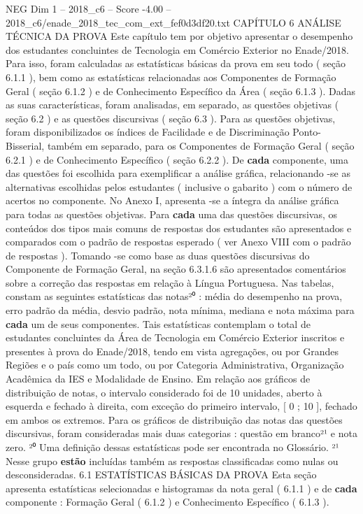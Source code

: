 \begin{textsample}{NEG Dim 1 – 2018\_c6 – Score -4.00 – 2018\_c6/enade\_2018\_tec\_com\_ext\_fef0d3df20.txt}  \label{ex:f1_neg_194}
CAPÍTULO 6 ANÁLISE TÉCNICA DA PROVA Este capítulo tem por objetivo apresentar o desempenho dos estudantes concluintes de Tecnologia em Comércio Exterior no Enade/2018.
Para isso, foram calculadas as estatísticas básicas da prova em seu todo ( seção 6.1.1 ), bem como as estatísticas relacionadas aos Componentes de Formação Geral ( seção 6.1.2 ) e de Conhecimento Específico da Área ( seção 6.1.3 ).
Dadas as suas características, foram analisadas, em separado, as questões objetivas ( seção 6.2 ) e as questões discursivas ( seção 6.3 ).
Para as questões objetivas, foram disponibilizados os índices de Facilidade e de Discriminação Ponto-Bisserial, também em separado, para os Componentes de Formação Geral ( seção 6.2.1 ) e de Conhecimento Específico ( seção 6.2.2 ).
De \textbf{cada} componente, uma das questões foi escolhida para exemplificar a análise gráfica, relacionando -se as alternativas escolhidas pelos estudantes ( inclusive o gabarito ) com o número de acertos no componente.
No Anexo I, apresenta -se a íntegra da análise gráfica para todas as questões objetivas.
Para \textbf{cada} uma das questões discursivas, os conteúdos dos tipos mais comuns de respostas dos estudantes são apresentados e comparados com o padrão de respostas esperado ( ver Anexo VIII com o padrão de respostas ).
Tomando -se como base as duas questões discursivas do Componente de Formação Geral, na seção 6.3.1.6 são apresentados comentários sobre a correção das respostas em relação à Língua Portuguesa.
Nas tabelas, constam as seguintes estatísticas das notas²⁰ : média do desempenho na prova, erro padrão da média, desvio padrão, nota mínima, mediana e nota máxima para \textbf{cada} um de seus componentes.
Tais estatísticas contemplam o total de estudantes concluintes da Área de Tecnologia em Comércio Exterior inscritos e presentes à prova do Enade/2018, tendo em vista agregações, ou por Grandes Regiões e o país como um todo, ou por Categoria Administrativa, Organização Acadêmica da IES e Modalidade de Ensino.
Em relação aos gráficos de distribuição de notas, o intervalo considerado foi de 10 unidades, aberto à esquerda e fechado à direita, com exceção do primeiro intervalo, [ 0 ; 10 ], fechado em ambos os extremos.
Para os gráficos de distribuição das notas das questões discursivas, foram consideradas mais duas categorias : questão em branco²¹ e nota zero. ²⁰ Uma definição dessas estatísticas pode ser encontrada no Glossário. ²¹ Nesse grupo \textbf{estão} incluídas também as respostas classificadas como nulas ou desconsideradas. 6.1 ESTATÍSTICAS BÁSICAS DA PROVA Esta seção apresenta estatísticas selecionadas e histogramas da nota geral ( 6.1.1 ) e de \textbf{cada} componente : Formação Geral ( 6.1.2 ) e Conhecimento Específico ( 6.1.3 ).

\end{textsample}
